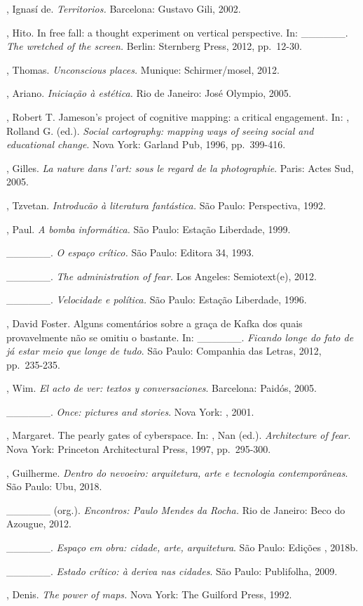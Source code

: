 \begin{Parskip}
, Ignasí de. \emph{Territorios.} Barcelona: Gustavo Gili,
2002.

, Hito. In free fall: a thought experiment on vertical
perspective. In: \_\_\_\_\_\_. \emph{The wretched of the screen.}
Berlin: Sternberg Press, 2012, pp.~12-30.

, Thomas. \emph{Unconscious places.} Munique: Schirmer/mosel, 2012.

, Ariano. \emph{Iniciação à estética.} Rio de Janeiro: José
Olympio, 2005.

, Robert T. Jameson's project of cognitive mapping: a critical
engagement. In: , Rolland G. (ed.). \emph{Social cartography:
mapping ways of seeing social and educational change}. Nova York: Garland
Pub, 1996, pp.~399-416.

, Gilles. \emph{La nature dans l'art: sous le regard de la
photographie}. Paris: Actes Sud, 2005.

, Tzvetan. \emph{Introducão à literatura fantástica.} São
Paulo: Perspectiva, 1992.

, Paul. \emph{A bomba informática.} São Paulo: Estação
Liberdade, 1999.

\_\_\_\_\_\_. \emph{O espaço crítico.} São Paulo: Editora 34, 1993.

\_\_\_\_\_\_. \emph{The administration of fear.} Los Angeles: Semiotext(e), 2012.

\_\_\_\_\_\_. \emph{Velocidade e política.} São Paulo: Estação
Liberdade, 1996.

, David Foster. Alguns comentários sobre a graça de Kafka dos
quais provavelmente não se omitiu o bastante. In: \_\_\_\_\_\_.
\emph{Ficando longe do fato de já estar meio que longe de tudo}. São
Paulo: Companhia das Letras, 2012, pp.~235-235.

, Wim. \emph{El acto de ver: textos y conversaciones}.
Barcelona: Paidós, 2005.

\_\_\_\_\_\_. \emph{Once: pictures and stories}. Nova York:
, 2001.

, Margaret. The pearly gates of cyberspace. In: , Nan
(ed.). \emph{Architecture of fear.} Nova York: Princeton Architectural
Press, 1997, pp.~295-300.

, Guilherme. \emph{Dentro do nevoeiro: arquitetura, arte e
tecnologia contemporâneas}. São Paulo: Ubu, 2018.

\_\_\_\_\_\_ (org.). \emph{Encontros: Paulo Mendes da Rocha.} Rio de
Janeiro: Beco do Azougue, 2012.

\_\_\_\_\_\_. \emph{Espaço em obra: cidade, arte, arquitetura}. São Paulo: Edições , 2018b.

\_\_\_\_\_\_. \emph{Estado crítico: à deriva nas cidades}. São
Paulo: Publifolha, 2009.


, Denis. \emph{The power of maps.} Nova York: The Guilford Press,
1992.
\end{Parskip}

